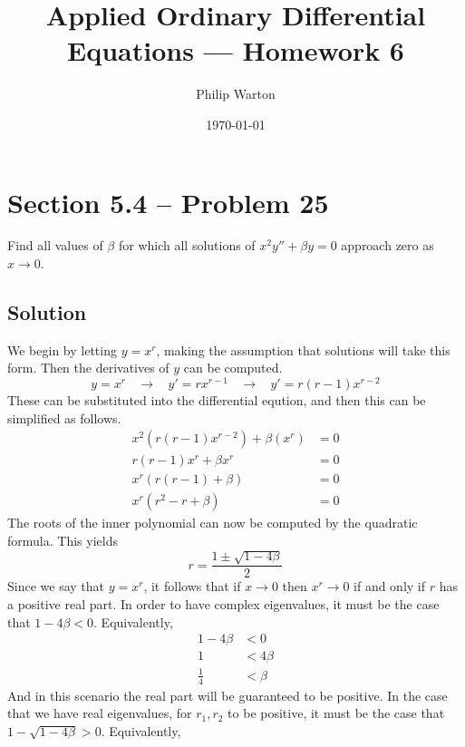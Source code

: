 \documentclass{article}
\theoremstyle{definition}
\begin{document}
\title{Applied Ordinary Differential Equations --- Homework 6}
\author{Philip Warton}
\date{\today}
\maketitle

\section*{Section 5.4 -- Problem 25}
    Find all values of $\beta$ for which all solutions of $x^2 y'' + \beta y = 0$
    approach zero as $x \rightarrow 0$. 
    \\ \hline
    \subsection*{Solution}
        We begin by letting $y = x^r$, making the assumption that solutions will take this form.
        Then the derivatives of $y$ can be computed.
        \[
        y = x^r \ \ \ \ \longrightarrow \ \ \ \ y' = r x^{r-1} \ \ \ \ \longrightarrow \ \ \ \ y' = r (r-1) x^{r-2}
        \] 
        These can be substituted into the differential eqution, and then this can be simplified as follows.
        \begin{align*}
            x^2 (r(r-1)x^{r-2}) + \beta (x^r) &= 0 \\
            r(r-1)x^r + \beta x^r &= 0 \\
            x^r (r(r-1) + \beta) &= 0 \\
            x^r (r^2 - r + \beta) &= 0 
        \end{align*}
        The roots of the inner polynomial can now be computed by the quadratic formula.
        This yields
        \[
        r = \frac{1 \pm \sqrt{1 - 4\beta}}{2}
        \] 
        Since we say that $y = x^r$, it follows that if $x \rightarrow 0$ then $x^r \rightarrow 0$ if and only if $r$ has a positive real part.
        In order to have complex eigenvalues, it must be the case that $1 - 4\beta < 0$. Equivalently,
        \begin{align*}
            1 - 4\beta &< 0 \\
            1 &< 4\beta \\
            \frac{1}{4} &< \beta
        \end{align*}
        And in this scenario the real part will be guaranteed to be positive.
        In the case that we have real eigenvalues, for $r_1, r_2$ to be positive, it must be the case that $1 - \sqrt{1 - 4\beta} > 0$. Equivalently,
\end{document}
